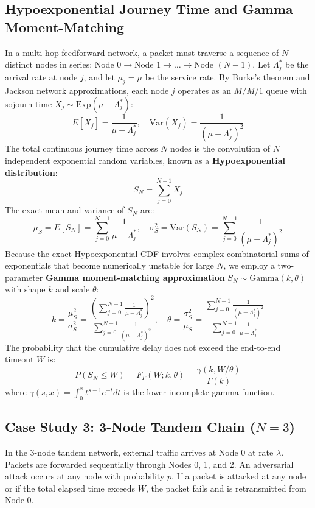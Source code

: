 \documentclass[12pt,onecolumn]{article}
\begin{document}
\subsection{Hypoexponential Journey Time and Gamma Moment-Matching}
In a multi-hop feedforward network, a packet must traverse a sequence of $N$ distinct nodes in series: Node $0 \to \text{Node } 1 \to \dots \to \text{Node } (N-1)$. Let $\Lambda_j^*$ be the arrival rate at node $j$, and let $\mu_j = \mu$ be the service rate. By Burke's theorem and Jackson network approximations, each node $j$ operates as an $M/M/1$ queue with sojourn time $X_j \sim \text{Exp}(\mu - \Lambda_j^*)$:
\begin{equation}
E[X_j] = \frac{1}{\mu - \Lambda_j^*}, \quad \text{Var}(X_j) = \frac{1}{(\mu - \Lambda_j^*)^2}
\end{equation}
The total continuous journey time across $N$ nodes is the convolution of $N$ independent exponential random variables, known as a \textbf{Hypoexponential distribution}:
\begin{equation}
S_N = \sum_{j=0}^{N-1} X_j
\end{equation}
The exact mean and variance of $S_N$ are:
\begin{equation}
\mu_S = E[S_N] = \sum_{j=0}^{N-1} \frac{1}{\mu - \Lambda_j^*}, \quad \sigma_S^2 = \text{Var}(S_N) = \sum_{j=0}^{N-1} \frac{1}{(\mu - \Lambda_j^*)^2}
\end{equation}
Because the exact Hypoexponential CDF involves complex combinatorial sums of exponentials that become numerically unstable for large $N$, we employ a two-parameter \textbf{Gamma moment-matching approximation} $S_N \sim \text{Gamma}(k, \theta)$ with shape $k$ and scale $\theta$:
\begin{equation}
k = \frac{\mu_S^2}{\sigma_S^2} = \frac{\left(\sum_{j=0}^{N-1} \frac{1}{\mu - \Lambda_j^*}\right)^2}{\sum_{j=0}^{N-1} \frac{1}{(\mu - \Lambda_j^*)^2}}, \quad \theta = \frac{\sigma_S^2}{\mu_S} = \frac{\sum_{j=0}^{N-1} \frac{1}{(\mu - \Lambda_j^*)^2}}{\sum_{j=0}^{N-1} \frac{1}{\mu - \Lambda_j^*}}
\label{eq:gamma_moments}
\end{equation}
The probability that the cumulative delay does not exceed the end-to-end timeout $W$ is:
\begin{equation}
P(S_N \le W) = F_\Gamma(W; k, \theta) = \frac{\gamma(k, W/\theta)}{\Gamma(k)}
\end{equation}
where $\gamma(s, x) = \int_0^x t^{s-1} e^{-t} dt$ is the lower incomplete gamma function.

\subsection{Case Study 3: 3-Node Tandem Chain (\texorpdfstring{$N=3$}{N=3})}
In the 3-node tandem network, external traffic arrives at Node 0 at rate $\lambda$. Packets are forwarded sequentially through Nodes 0, 1, and 2. An adversarial attack occurs at any node with probability $p$. If a packet is attacked at any node or if the total elapsed time exceeds $W$, the packet fails and is retransmitted from Node 0.
\end{document}
